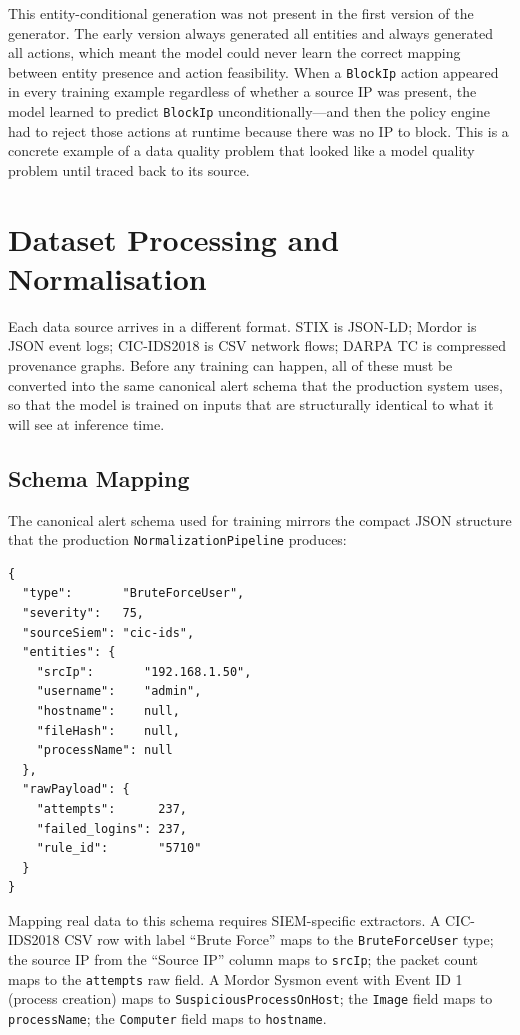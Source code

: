 This entity-conditional generation was not present in the first version of the generator. The early version always generated all entities and always generated all actions, which meant the model could never learn the correct mapping between entity presence and action feasibility. When a \texttt{BlockIp} action appeared in every training example regardless of whether a source IP was present, the model learned to predict \texttt{BlockIp} unconditionally---and then the policy engine had to reject those actions at runtime because there was no IP to block. This is a concrete example of a data quality problem that looked like a model quality problem until traced back to its source.

\section{Dataset Processing and Normalisation}
\label{sec:dataset-processing}

Each data source arrives in a different format. STIX is JSON-LD; Mordor is JSON event logs; CIC-IDS2018 is CSV network flows; DARPA TC is compressed provenance graphs. Before any training can happen, all of these must be converted into the same canonical alert schema that the production system uses, so that the model is trained on inputs that are structurally identical to what it will see at inference time.

\subsection{Schema Mapping}

The canonical alert schema used for training mirrors the compact JSON structure that the production \texttt{NormalizationPipeline} produces:

\begin{verbatim}
{
  "type":       "BruteForceUser",
  "severity":   75,
  "sourceSiem": "cic-ids",
  "entities": {
    "srcIp":       "192.168.1.50",
    "username":    "admin",
    "hostname":    null,
    "fileHash":    null,
    "processName": null
  },
  "rawPayload": {
    "attempts":      237,
    "failed_logins": 237,
    "rule_id":       "5710"
  }
}
\end{verbatim}

Mapping real data to this schema requires SIEM-specific extractors. A CIC-IDS2018 CSV row with label ``Brute Force'' maps to the \texttt{BruteForceUser} type; the source IP from the ``Source IP'' column maps to \texttt{srcIp}; the packet count maps to the \texttt{attempts} raw field. A Mordor Sysmon event with Event ID 1 (process creation) maps to \texttt{SuspiciousProcessOnHost}; the \texttt{Image} field maps to \texttt{processName}; the \texttt{Computer} field maps to \texttt{hostname}.

